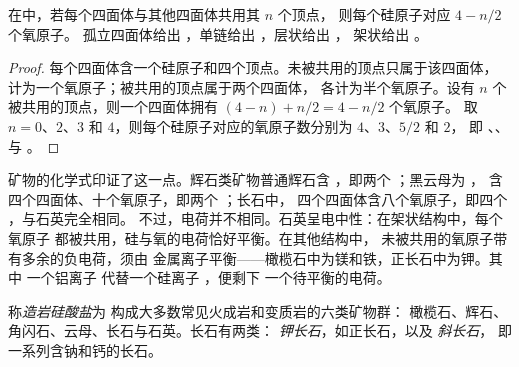 \begin{proposition}[氧原子计数]\label{prop:g11:minerals:sharing}
在中，若每个四面体与其他四面体共用其 $n$ 个顶点，
则每个硅原子对应 $4 - n/2$ 个氧原子。
孤立四面体给出 ，单链给出 ，层状给出 ，
架状给出 。
\end{proposition}

\begin{proof}
每个四面体含一个硅原子和四个顶点。未被共用的顶点只属于该四面体，
计为一个氧原子；被共用的顶点属于两个四面体，
各计为半个氧原子。设有 $n$ 个被共用的顶点，则一个四面体拥有
$(4 - n) + n/2 = 4 - n/2$ 个氧原子。
取 $n = 0$、$2$、$3$ 和 $4$，则每个硅原子对应的氧原子数分别为 $4$、$3$、$5/2$ 和 $2$，
即 、、 与 。
\end{proof}

矿物的化学式印证了这一点。辉石类矿物普通辉石含
，即两个 ；黑云母为 ，
含四个四面体、十个氧原子，即两个 ；长石中，
四个四面体含八个氧原子，即四个 ，与石英完全相同。
不过，电荷并不相同。石英呈电中性：在架状结构中，每个氧原子
都被共用，硅与氧的电荷恰好平衡。在其他结构中，
未被共用的氧原子带有多余的负电荷，须由
金属离子平衡——橄榄石中为镁和铁，正长石中为钾。其中
一个铝离子  代替一个硅离子 ，便剩下
一个待平衡的电荷。

\begin{definition}[造岩硅酸盐]\label{def:g11:minerals:rock-forming}
称\emph{造岩硅酸盐}为
构成大多数常见火成岩和变质岩的六类矿物群：
橄榄石、辉石、角闪石、云母、长石与石英。长石有两类：
\emph{钾长石}，如正长石，以及
\emph{斜长石}，
即一系列含钠和钙的长石。
\end{definition}

